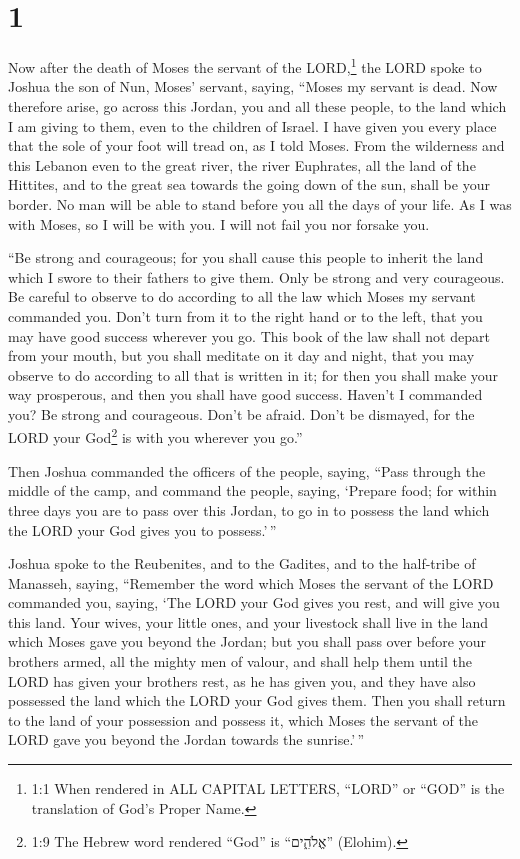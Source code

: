 \hypertarget{section}{%
\section{1}\label{section}}

 Now after the death of Moses the servant of the
LORD,\footnote{1:1 When rendered in ALL CAPITAL LETTERS, ``LORD'' or
  ``GOD'' is the translation of God's Proper Name.} the LORD spoke to
Joshua the son of Nun, Moses' servant, saying,  ``Moses my
servant is dead. Now therefore arise, go across this Jordan, you and all
these people, to the land which I am giving to them, even to the
children of Israel.  I have given you every place that the
sole of your foot will tread on, as I told Moses.  From the
wilderness and this Lebanon even to the great river, the river
Euphrates, all the land of the Hittites, and to the great sea towards
the going down of the sun, shall be your border.  No man
will be able to stand before you all the days of your life. As I was
with Moses, so I will be with you. I will not fail you nor forsake you.

 ``Be strong and courageous; for you shall cause this people
to inherit the land which I swore to their fathers to give them.
 Only be strong and very courageous. Be careful to observe
to do according to all the law which Moses my servant commanded you.
Don't turn from it to the right hand or to the left, that you may have
good success wherever you go.  This book of the law shall
not depart from your mouth, but you shall meditate on it day and night,
that you may observe to do according to all that is written in it; for
then you shall make your way prosperous, and then you shall have good
success.  Haven't I commanded you? Be strong and courageous.
Don't be afraid. Don't be dismayed, for the LORD your God\footnote{1:9
  The Hebrew word rendered ``God'' is ``אֱלֹהִ֑ים'' (Elohim).} is with
you wherever you go.''

 Then Joshua commanded the officers of the people, saying,
 ``Pass through the middle of the camp, and command the
people, saying, `Prepare food; for within three days you are to pass
over this Jordan, to go in to possess the land which the LORD your God
gives you to possess.'\,''

 Joshua spoke to the Reubenites, and to the Gadites, and to
the half-tribe of Manasseh, saying,  ``Remember the word
which Moses the servant of the LORD commanded you, saying, `The LORD
your God gives you rest, and will give you this land.  Your
wives, your little ones, and your livestock shall live in the land which
Moses gave you beyond the Jordan; but you shall pass over before your
brothers armed, all the mighty men of valour, and shall help them
 until the LORD has given your brothers rest, as he has
given you, and they have also possessed the land which the LORD your God
gives them. Then you shall return to the land of your possession and
possess it, which Moses the servant of the LORD gave you beyond the
Jordan towards the sunrise.'\,''

